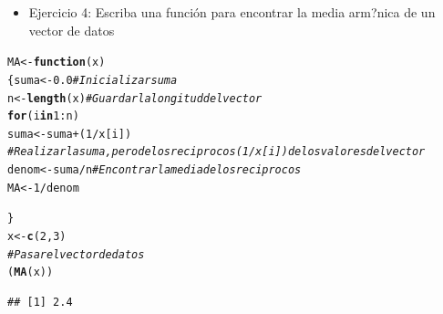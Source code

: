 \documentclass[12pt,letterpaper]{article}\usepackage[]{graphicx}\usepackage[]{color}
\makeatletter
\newcommand{\hlnum}[1]{\textcolor[rgb]{0.686,0.059,0.569}{#1}}%
\newcommand{\hlcom}[1]{\textcolor[rgb]{0.678,0.584,0.686}{\textit{#1}}}%
\newcommand{\hlopt}[1]{\textcolor[rgb]{0,0,0}{#1}}%
\newcommand{\hlstd}[1]{\textcolor[rgb]{0.345,0.345,0.345}{#1}}%
\newcommand{\hlkwa}[1]{\textcolor[rgb]{0.161,0.373,0.58}{\textbf{#1}}}%
\newcommand{\hlkwb}[1]{\textcolor[rgb]{0.69,0.353,0.396}{#1}}%
\newcommand{\hlkwc}[1]{\textcolor[rgb]{0.333,0.667,0.333}{#1}}%
\newcommand{\hlkwd}[1]{\textcolor[rgb]{0.737,0.353,0.396}{\textbf{#1}}}%
\newenvironment{kframe}{%
 \def\at@end@of@kframe{}%
 \ifinner\ifhmode%
  \def\at@end@of@kframe{\end{minipage}}%
  \begin{minipage}{\columnwidth}%
 \fi\fi%
 \def\FrameCommand##1{\hskip\@totalleftmargin \hskip-\fboxsep
 \colorbox{shadecolor}{##1}\hskip-\fboxsep
     \hskip-\linewidth \hskip-\@totalleftmargin \hskip\columnwidth}%
 \MakeFramed {\advance\hsize-\width
   \@totalleftmargin\z@ \linewidth\hsize
   \@setminipage}}%
 {\par\unskip\endMakeFramed%
 \at@end@of@kframe}
\newenvironment{knitrout}{}{} %
\makeatother
\begin{document}
\newpage
\begin{itemize}
\item Ejercicio 4: Escriba una funci\'on para encontrar la media arm?nica de un vector de datos
\end{itemize}
\begin{knitrout}
\color{fgcolor}\begin{kframe}
\begin{alltt}
\hlstd{MA} \hlkwb{<-} \hlkwa{function}\hlstd{(}\hlkwc{x}\hlstd{)}
  \hlstd{\{suma} \hlkwb{<-} \hlnum{0.0} \hlcom{# Inicializar suma}
  \hlstd{n} \hlkwb{<-} \hlkwd{length}\hlstd{(x)} \hlcom{# Guardar la longitud del vector}
  \hlkwa{for}\hlstd{(i} \hlkwa{in} \hlnum{1}\hlopt{:}\hlstd{n)}
    \hlstd{suma} \hlkwb{<-} \hlstd{suma} \hlopt{+} \hlstd{(}\hlnum{1}\hlopt{/}\hlstd{x[i])}
  \hlcom{# Realizar la suma, pero de los reciprocos (1/x[i]) de los valores del vector}
  \hlstd{denom} \hlkwb{<-} \hlstd{suma}\hlopt{/}\hlstd{n} \hlcom{# Encontrar la media de los reciprocos}
  \hlstd{MA}\hlkwb{<-}\hlnum{1}\hlopt{/}\hlstd{denom}

\hlstd{\}}
\hlstd{x} \hlkwb{<-} \hlkwd{c}\hlstd{(}\hlnum{2}\hlstd{,}\hlnum{3}\hlstd{)}
\hlcom{# Pasar el vector de datos}
\hlstd{(}\hlkwd{MA}\hlstd{(x))}
\end{alltt}
\begin{verbatim}
## [1] 2.4
\end{verbatim}
\end{kframe}
\end{knitrout}
\end{document}
